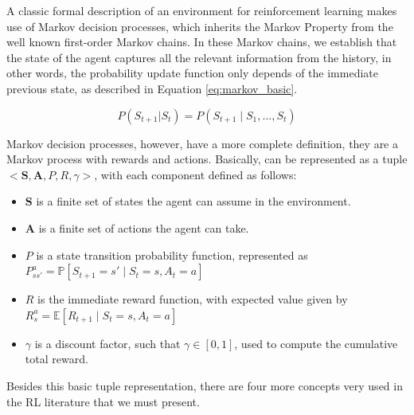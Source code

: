 A classic formal description of an environment for reinforcement learning makes use of Markov decision processes, which inherits the Markov Property from the well known first-order Markov chains. In these Markov chains, we establish that the state of the agent captures all the relevant information from the history, in other words, the probability update function only depends of the immediate previous state, as described in Equation \eqref{eq:markov_basic}.

\begin{equation}
P(S_{t+1} | S_t) = P(S_{t+1} \mid S_1, ..., S_t)
\label{eq:markov_basic}
\end{equation}

Markov decision processes, however, have a more complete definition, they are a Markov process with rewards and actions. Basically, can be represented as a tuple $<\textbf{S}, \textbf{A}, P, R, \gamma>$, with each component defined as follows:
\begin{itemize}
\item
	$\textbf{S}$ is a finite set of states the agent can assume in the environment.
\item
	$\textbf{A}$ is a finite set of actions the agent can take.
\item
	$P$ is a state transition probability function, represented as $P_{ss'}^a = \mathbb{P}[S_{t+1}=s' \mid S_t = s, A_t = a]$
\item
	$R$ is the immediate reward function, with expected value given by $R_s^a = \mathbb{E}[R_{t+1} \mid S_t = s, A_t = a]$
\item
	$\gamma$ is a discount factor, such that $\gamma \in [0,1]$, used to compute the cumulative total reward.
	
\end{itemize}

Besides this basic tuple representation, there are four more concepts very used in the RL literature that we must present.

